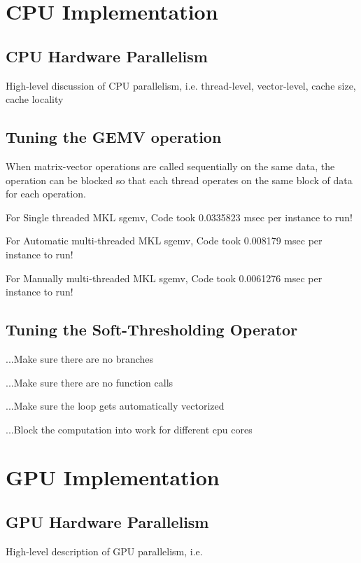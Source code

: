 \documentclass[10pt,twocolumn,letterpaper]{article}
\begin{document}
\section{CPU Implementation}
\subsection{CPU Hardware Parallelism}
High-level discussion of CPU parallelism, i.e.
thread-level, vector-level, cache size, cache locality
\subsection{Tuning the GEMV operation}
When matrix-vector operations are called sequentially on the same data,
the operation can be blocked so that each thread operates on the same block of data for each operation.

For Single threaded MKL sgemv, Code took          0.0335823 msec per instance to run!

For Automatic multi-threaded MKL sgemv, Code took 0.008179 msec per instance to run!

For Manually multi-threaded MKL sgemv, Code took  0.0061276 msec per instance to run!

\subsection{Tuning the Soft-Thresholding Operator}
...Make sure there are no branches

...Make sure there are no function calls

...Make sure the loop gets automatically vectorized

...Block the computation into work for different cpu cores

\section{GPU Implementation}
\subsection{GPU Hardware Parallelism}
High-level description of GPU parallelism, i.e.
\end{document}
